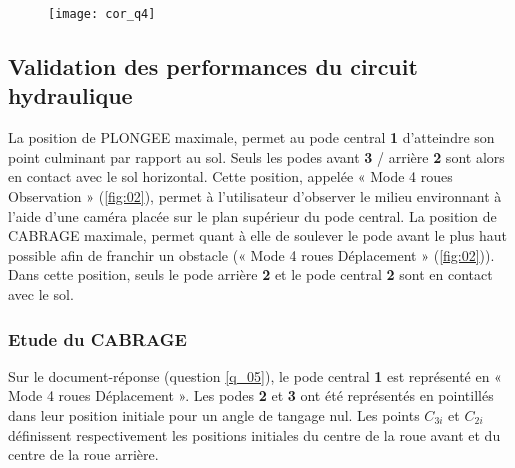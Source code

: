 \ifprof
\begin{corrige}
\begin{figure}[H]
\centering
\texttt{[image: cor\_q4]}
\end{figure}
\end{corrige}
\else
\fi



\subsection{Validation des performances du circuit hydraulique}
\ifprof
\else

La position de PLONGEE maximale, permet au pode central \textbf{1} d’atteindre son point culminant par rapport au sol. Seuls les podes avant \textbf{3} / arrière \textbf{2} sont alors en contact avec le sol horizontal. Cette position, appelée « Mode 4 roues Observation » (\autoref{fig:02}), permet à l’utilisateur d’observer le milieu environnant à l’aide d’une caméra placée sur le plan supérieur du pode central. La position de CABRAGE maximale, permet quant à elle de soulever le pode avant le plus haut possible afin de franchir un obstacle (« Mode 4 roues Déplacement » (\autoref{fig:02})). Dans cette position, seuls le pode arrière \textbf{2} et le pode central \textbf{2} sont en contact avec le sol.
\fi

\subsubsection{Etude du CABRAGE}
\ifprof
\else


Sur le document-réponse (question \ref{q_05}), le pode central \textbf{1} est représenté en « Mode 4 roues Déplacement ». Les podes \textbf{2} et \textbf{3} ont été représentés en pointillés dans leur position initiale pour un angle de tangage nul. Les points $C_{3i}$ et $C_{2i}$ définissent respectivement les positions initiales du centre de la roue avant et du centre de la roue arrière.
\fi

\ifprof
\begin{corrige}
\end{corrige}
\else
\fi


